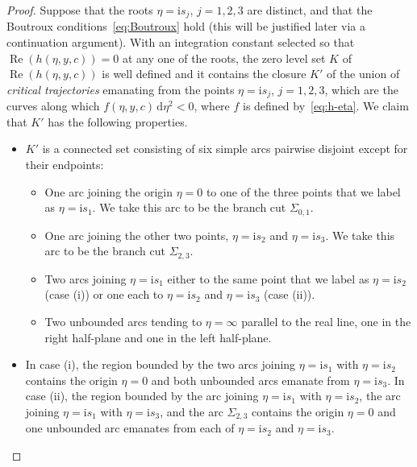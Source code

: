 \documentclass[pdftex]{sigma}
\numberwithin{equation}{section}
\begin{document}
\begin{proof}
Suppose that the roots $\eta=\mathrm{i} s_j$, $j=1,2,3$ are distinct, and that the Boutroux conditions~\eqref{eq:Boutroux} hold (this will be justified later via a continuation argument). With an integration constant selected so that $\operatorname{Re}(h(\eta,y,c))=0$ at any one of the roots, the zero level set $K$ of $\operatorname{Re}(h(\eta,y,c))$ is well defined and it contains the closure $K'$ of the union of \emph{critical trajectories} emanating from the points $\eta=\mathrm{i} s_j$, $j=1,2,3$, which are the curves along which $f(\eta,y,c)\,\mathrm{d}\eta^2<0$, where $f$ is defined by~\eqref{eq:h-eta}. We claim that $K'$ has the following properties.
\begin{itemize}\itemsep=0pt
\item $K'$ is a connected set consisting of six simple arcs pairwise disjoint except for their endpoints:
\begin{itemize}\itemsep=0pt
\item One arc joining the origin $\eta=0$ to one of the three points that we label as $\eta=\mathrm{i} s_1$. We take this arc to be the branch cut $\Sigma_{0,1}$.
\item One arc joining the other two points, $\eta=\mathrm{i} s_2$ and $\eta=\mathrm{i} s_3$. We take this arc to be the branch cut $\Sigma_{2,3}$.
\item Two arcs joining $\eta=\mathrm{i} s_1$ either to the same point that we label as $\eta=\mathrm{i} s_2$ (case (i)) or one each to $\eta=\mathrm{i} s_2$ and $\eta=\mathrm{i} s_3$ (case (ii)).
\item Two unbounded arcs tending to $\eta=\infty$ parallel to the real line, one in the right half-plane and one in the left half-plane.
\end{itemize}
\item In case (i), the region bounded by the two arcs joining $\eta=\mathrm{i} s_1$ with $\eta=\mathrm{i} s_2$ contains the origin $\eta=0$ and both unbounded arcs emanate from $\eta=\mathrm{i} s_3$. In case (ii), the region bounded by the arc joining $\eta=\mathrm{i} s_1$ with $\eta=\mathrm{i} s_2$, the arc joining $\eta=\mathrm{i} s_1$ with $\eta=\mathrm{i} s_3$, and the arc $\Sigma_{2,3}$ contains the origin $\eta=0$ and one unbounded arc emanates from each of $\eta=\mathrm{i} s_2$ and $\eta=\mathrm{i} s_3$.
\end{itemize}

\end{proof}
\end{document}
